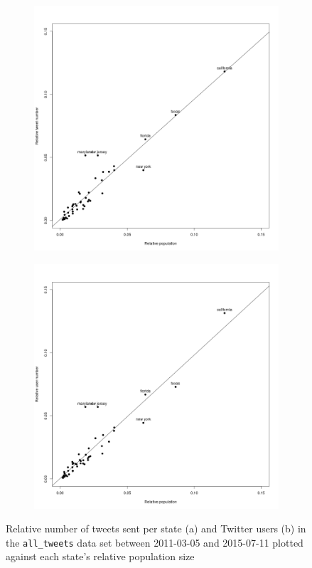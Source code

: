 \documentclass[11pt, a4paper,twoside]{report}\usepackage[]{graphicx}\usepackage[]{color}
\begin{document}
\begin{figure}[H]
\centering
 \begin{subfigure}[t]{0.6\textwidth}
  \includegraphics[width=1\linewidth]{ScatterTweetPop.png}
  \caption{}
  \label{fig:tweets_state_full_scatter}
  \end{subfigure}
  
  \begin{subfigure}[t]{0.6\textwidth}
  \includegraphics[width=1\linewidth]{ScatterTweetPop_user.png}
  \caption{}
  \label{fig:tweets_state_full_scatter_user}
  \end{subfigure}

\caption{Relative number of tweets sent per state (a) and Twitter users (b) in the \texttt{all\_tweets} data set between 2011-03-05 and 2015-07-11 plotted against each state's relative population size}
\end{figure}
\end{document}
